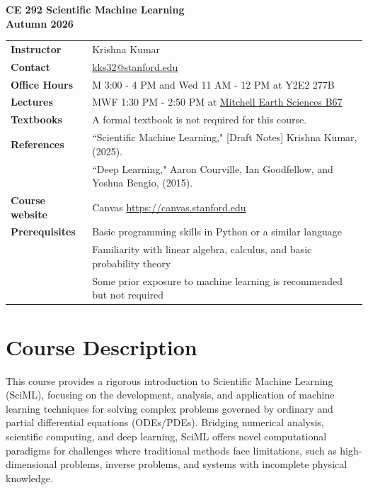 \documentclass[11pt,fourier]{article}
\begin{document}
	
	\begin{center}
		\Large\textbf{CE 292 Scientific Machine Learning}\\
		\large\textbf{Autumn 2026}
	\end{center}
	
	\vspace{1em}
	\noindent
	\begin{tabularx}{\textwidth}{@{}p{}X@{}}
		\toprule
		\textbf{Instructor} & Krishna Kumar \\
		\textbf{Contact} & \href{mailto:kks32@stanford.edu}{kks32@stanford.edu}  \\
		\midrule
		\textbf{Office Hours} & M 3:00 - 4 PM and Wed 11 AM - 12 PM at Y2E2 277B \\
		\textbf{Lectures} & MWF 1:30 PM - 2:50 PM at \href{https://campus-map.stanford.edu/?id=04-560}{Mitchell Earth Sciences B67} \\
		\textbf{Textbooks} & A formal textbook is not required for this course. \\
		\textbf{References} & ``Scientific Machine Learning," [Draft Notes] Krishna Kumar, (2025). \\
		& ``Deep Learning," Aaron Courville, Ian Goodfellow, and Yoshua Bengio, (2015). \\
		\textbf{Course website} & Canvas \href{https://canvas.stanford.edu}{https://canvas.stanford.edu} \\
		\textbf{Prerequisites} & Basic programming skills in Python or a similar language\\
		& Familiarity with linear algebra, calculus, and basic probability theory\\
		& Some prior exposure to machine learning is recommended but not required\\
		\bottomrule
	\end{tabularx}
	
	\section*{Course Description}
	This course provides a rigorous introduction to Scientific Machine Learning (SciML), focusing on the development, analysis, and application of machine learning techniques for solving complex problems governed by ordinary and partial differential equations (ODEs/PDEs). Bridging numerical analysis, scientific computing, and deep learning, SciML offers novel computational paradigms for challenges where traditional methods face limitations, such as high-dimensional problems, inverse problems, and systems with incomplete physical knowledge.
	
\end{document}
